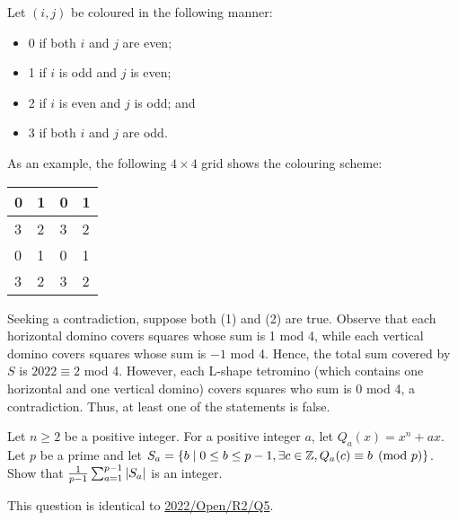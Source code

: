 \begin{solution*}
    Let $(i, j)$ be coloured in the following manner:
    \begin{itemize}
        \item 0 if both $i$ and $j$ are even;
        \item 1 if $i$ is odd and $j$ is even;
        \item 2 if $i$ is even and $j$ is odd; and
        \item 3 if both $i$ and $j$ are odd.
    \end{itemize}

    As an example, the following $4 \times 4$ grid shows the colouring scheme:
    \begin{table}[H]
        \centering
        \begin{tabular}{|l|l|l|l|}
        \hline
        0 & 1 & 0 & 1 \\ \hline
        3 & 2 & 3 & 2 \\ \hline
        0 & 1 & 0 & 1 \\ \hline
        3 & 2 & 3 & 2 \\ \hline
        \end{tabular}
    \end{table}

    Seeking a contradiction, suppose both (1) and (2) are true. Observe that each horizontal domino covers squares whose sum is 1 mod 4, while each vertical domino covers squares whose sum is $-1$ mod 4. Hence, the total sum covered by $S$ is $2022 \equiv 2$ mod 4. However, each L-shape tetromino (which contains one horizontal and one vertical domino) covers squares who sum is 0 mod 4, a contradiction. Thus, at least one of the statements is false.
\end{solution*}

\begin{question}\label{Q::2023-O-2-3}
    Let $n \geq 2$ be a positive integer. For a positive integer $a$, let $Q_a(x) = x^n + ax$. Let $p$ be a prime and let $S_a = \left\lbrace b \mid 0 \leq b \leq p - 1, \exists c \in \mathbb{Z}, Q_a(c) \equiv b \pmod{p} \right\rbrace$. Show that $\frac{1}{p-1} \sum_{a=1}^{p-1} \left\lvert S_a \right\rvert$ is an integer.
\end{question}
\begin{remark}
    This question is identical to \hyperref[Q::2022-O-2-5]{2022/Open/R2/Q5}.
\end{remark}

